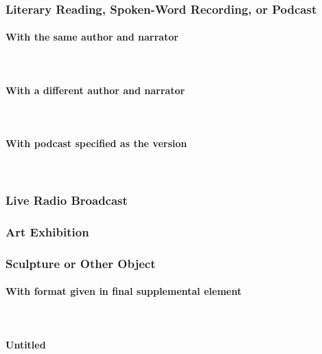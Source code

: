 \documentclass{ltxdockit}
\newcommand{\myparagraph}[1]{\paragraph{#1}\mbox{}\\}
\begin{document}
\subsubsection{Literary Reading, Spoken-Word Recording, or Podcast} %
\label{sub:literary_reading_spoken_word_recording_or_podcast}
\myparagraph{With the same author and narrator} %
\label{ssub:with_the_same_author_and_narrator}
\begin{refsection}
	\printbibliography[heading=none]
\end{refsection}
\myparagraph{With a different author and narrator} %
\label{ssub:with_a_different_author_and_narrator}
\begin{refsection}
	\printbibliography[heading=none]
\end{refsection}
\myparagraph{With podcast specified as the version} %
\label{ssub:with_podcast_specified_as_the_version}
\begin{refsection}
	\printbibliography[heading=none]
\end{refsection}
\subsubsection{Live Radio Broadcast} %
\label{sub:live_radio_broadcast}
\begin{refsection}
	\printbibliography[heading=none]
\end{refsection}
\subsubsection{Art Exhibition} %
\label{sub:art_exhibition}
\begin{refsection}
	\printbibliography[heading=none]
\end{refsection}
\subsubsection{Sculpture or Other Object} %
\label{sub:sculpture_or_other_object}
\myparagraph{With format given in final supplemental element} %
\label{ssub:with_format_given_in_final_supplemental_element}
\begin{refsection}
	\printbibliography[heading=none]
\end{refsection}
\myparagraph{Untitled} %
\label{ssub:untitled_sculpture}
\begin{refsection}
	\printbibliography[heading=none]
\end{refsection}
\end{document}
